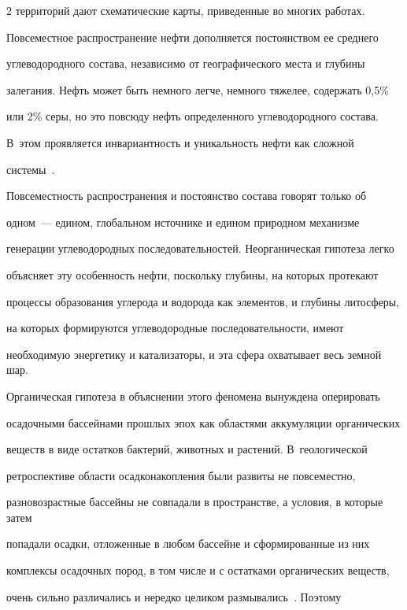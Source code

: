 \begin{multicols}{2}
территорий дают схематические карты, приведенные во многих работах. 

     

     Повсеместное распространение нефти дополняется постоянством ее среднего 

углеводородного состава, независимо от географического места и глубины 

залегания. Нефть может быть немного легче, немного тяжелее, содержать 0,5\% 

или 2\% серы, но это повсюду нефть определенного углеводородного состава. 

В~этом проявляется инвариантность и уникальность нефти как сложной 

системы~\cite{21s}.

     

     Повсеместность распространения и постоянство состава говорят только об 

одном~--- едином, глобальном источнике и едином природном механизме 

генерации углеводородных последовательностей. Неорганическая гипотеза легко 

объясняет эту особенность нефти, поскольку глубины, на которых протекают 

процессы образования углерода и водорода как элементов, и глубины литосферы, 

на которых формируются углеводородные последовательности, имеют 

необходимую энергетику и катализаторы, и эта сфера охватывает весь земной шар. 

     

     Органическая гипотеза в объяснении этого феномена вынуждена оперировать 

осадочными бассейнами прошлых эпох как областями аккумуляции органических 

веществ в виде остатков бактерий, животных и растений. В~геологической 

ретроспективе области осадконакопления были развиты не повсеместно, 

разновозрастные бассейны не совпадали в пространстве, а условия, в которые затем 

попадали осадки, отложенные в любом бассейне и сформированные из них 

комплексы осадочных пород, в том числе и с остатками органических веществ, 

очень сильно различались и нередко целиком размывались~\cite{19s}. Поэтому 


\end{multicols}
